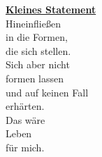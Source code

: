 \newpage\null\vfill

\begin{center}
    {
    \underline{\textbf{Kleines Statement}}
    \begingroup
        \renewcommand{\thefootnote}{}
    \endgroup
    }%
    \vspace{1.25em}\\
    Hineinflie\ss en\\
    in die Formen,\\
    die sich stellen.\\
    Sich aber nicht\\
    formen lassen\\
    und auf keinen Fall\\
    erhärten.\\
    \vspace{0.75em} Das wäre
    \\Leben
    \\für mich.
    \\
    \vspace{6cm}\ \\
\end{center}\vfill
